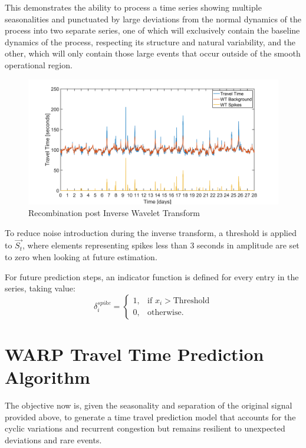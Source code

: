\documentclass[a4paper, 10pt, conference]{ieeeconf}      %
\begin{document}
This demonstrates the ability to process a time series showing multiple seasonalities and punctuated by large deviations from the normal dynamics of the process into two separate series, one of which will exclusively contain the baseline dynamics of the process, respecting its structure and natural variability, and the other, which will only contain those large events that occur outside of the smooth operational region.

\begin{figure}[htbp]
	\centerline{\includegraphics[width=\linewidth]{./images/Splitting.png}}
	\caption{Recombination post Inverse Wavelet Transform}
	\label{fig:splitting}
\end{figure}
To reduce noise introduction during the inverse transform, a threshold is applied to $\vec{S_t}$, where elements representing spikes less than 3 seconds in amplitude are set to zero when looking at future estimation.

For future prediction steps, an indicator function is defined for every entry in the series, taking value:
\begin{equation}
    \delta_i^{spike}=
    \begin{cases}
      1, & \text{if } x_i > \text{Threshold}\\
      0, & \text{otherwise.}
    \end{cases}
    \label{delta}
  \end{equation}
  
\section{WARP Travel Time Prediction Algorithm} \label{algorithm}
The objective now is, given the seasonality and separation of the original signal provided above, to generate a time travel prediction model that accounts for the cyclic variations and recurrent congestion but remains resilient to unexpected deviations and rare events.
\end{document}
